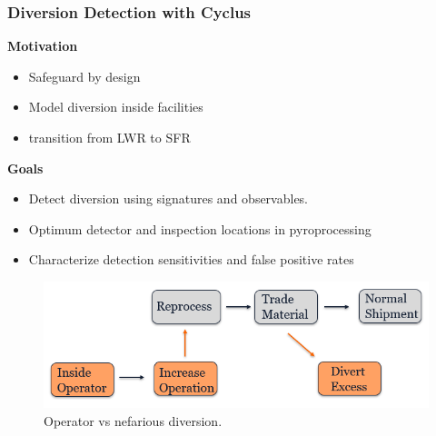 \begin{frame}
  \frametitle{Diversion Detection with Cyclus}
  	\textbf{Motivation}
        \begin{itemize}
                \item Safeguard by design
                \item Model diversion inside facilities
                \item transition from LWR to SFR
        \end{itemize}
    \textbf{Goals}
    	\begin{itemize}
    		\item Detect diversion using signatures and observables.
    		\item Optimum detector and inspection locations in pyroprocessing
    		\item Characterize detection sensitivities and false positive rates
    	\end{itemize}
  \begin{figure}
    \includegraphics[width=0.7\linewidth]{./images/westphal-diversion}
    \caption{Operator vs nefarious diversion.}
    \label{fig:diversion}
  \end{figure}
\end{frame}

